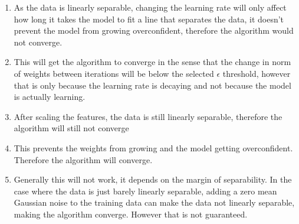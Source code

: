 \begin{answer}
\begin{enumerate}
  \item As the data is linearly separable, changing the learning rate will only affect how long it takes the model to fit a line that separates the data, it doesn't prevent the model from growing overconfident, therefore the algorithm would not converge.
  \item This will get the algorithm to converge in the sense that the change in norm of weights between iterations will be below the selected $\epsilon$ threshold, however that is only because the learning rate is decaying and not because the model is actually learning. 
  \item After scaling the features, the data is still linearly separable, therefore the algorithm will still not converge 
  \item This prevents the weights from growing and the model getting overconfident. Therefore the algorithm will converge.
  \item Generally this will not work, it depends on the margin of separability. In the case where the data is just barely linearly separable, adding a zero mean Gaussian noise to the training data can make the data not linearly separable, making the algorithm converge. However that is not guaranteed.
\end{enumerate}

\end{answer}
